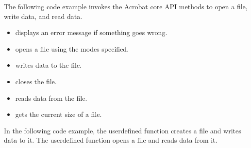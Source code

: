 \documentclass[letterpaper,12pt,english,openany,oneside]{sphinxmanual}
\begin{document}
The following code example invokes the Acrobat core API methods to open a file, write data, and read data.
\begin{itemize}
\item {} 
 displays an error message if something goes wrong.

\item {} 
 opens a file using the modes specified.

\item {} 
 writes data to the file.

\item {} 
 closes the file.

\item {} 
 reads data from the file.

\item {} 
 gets the current size of a file.

\end{itemize}

In the following code example, the  user\sphinxhyphen{}defined function creates a file and writes data to it. The  user\sphinxhyphen{}defined function opens a file and reads data from it.
\end{document}
